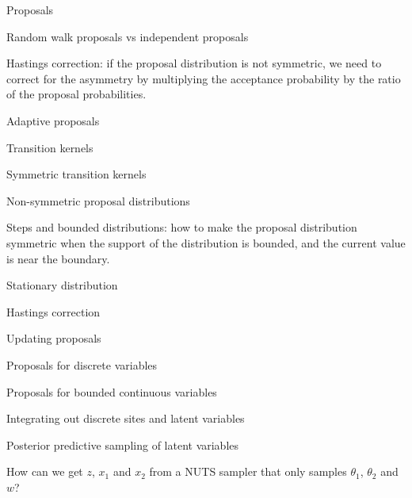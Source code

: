 \documentclass[10pt,aspectratio=169]{beamer}
\begin{document}
\begin{frame}{Proposals}

    Random walk proposals vs independent proposals

    Hastings correction: if the proposal distribution is not symmetric, we need to correct for the asymmetry by multiplying the acceptance probability by the ratio of the proposal probabilities.

    Adaptive proposals

\end{frame}

\begin{frame}{Transition kernels}

    Symmetric transition kernels

    Non-symmetric proposal distributions

    Steps and bounded distributions: how to make the proposal distribution symmetric when the support of the distribution is bounded, and the current value is near the boundary.

    Stationary distribution

    Hastings correction
    
\end{frame}

\begin{frame}{Updating proposals}
\end{frame}

\begin{frame}{Proposals for discrete variables}
\end{frame}

\begin{frame}{Proposals for bounded continuous variables}
\end{frame}

\begin{frame}{Integrating out discrete sites and latent variables}
\end{frame}

\begin{frame}{Posterior predictive sampling of latent variables}

    How can we get $z$, $x_1$ and $x_2$ from a NUTS sampler that only samples $\theta_1$, $\theta_2$ and $w$?

\end{frame}
\end{document}
